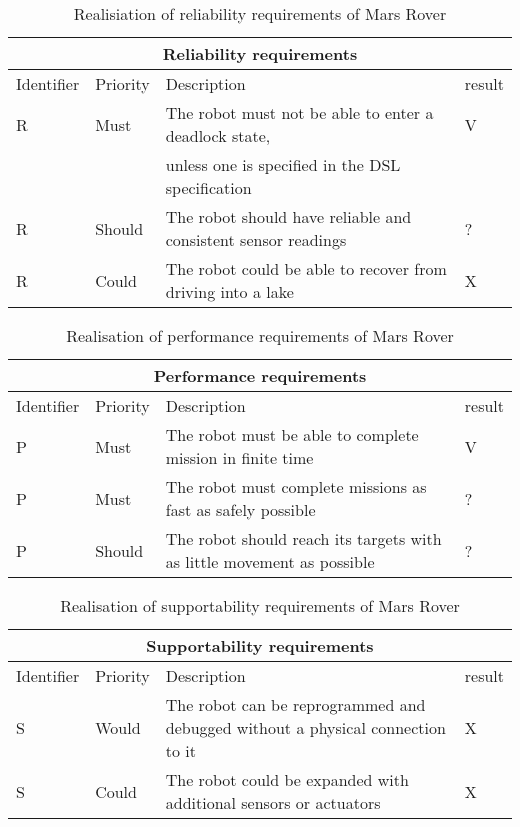 \setcounter{TCC}{1}
\begin{table}[H]
	\centering
	\begin{tabular}{|l|l|l|l|}
		\hline
		\multicolumn{4}{|c|}{Reliability requirements} \\  \hline
		\hline
		Identifier & Priority & Description & result \\  
		\hline
		\hline
		R\doTCC & Must & The robot must not be able to enter a deadlock state,
			& V\\  
				& 		& unless one is specified in the DSL specification 
			& \\  \hline
		R\doTCC & Should & The robot should have reliable and consistent 
			sensor readings & ?\\  \hline
		R\doTCC & Could & The robot could be able to recover from driving into
			a lake & X\\  
		\hline
	\end{tabular}
\caption{Realisiation of reliability requirements of Mars Rover}
\label{tbl:endReliabilityReq}
\end{table}

\setcounter{TCC}{1}
\begin{table}[H]
	\centering
	\begin{tabular}{|l|l|l|l|}
		\hline
		\multicolumn{4}{|c|}{Performance requirements} \\  \hline
		\hline
		Identifier & Priority & Description & result \\  
		\hline
		\hline
		P\doTCC & Must & The robot must be able to complete mission in finite 
			time & V \\  \hline
		P\doTCC & Must & The robot must complete missions as fast as safely 
			possible & ? \\   \hline
		P\doTCC & Should & The robot should reach its targets with as little 
			movement as possible & ? \\  
		\hline
	\end{tabular}
\caption{Realisation of performance requirements of Mars Rover}
\label{tbl:endPerformanceReq}
\end{table}

\setcounter{TCC}{1}
\begin{table}[H]
	\centering
	\begin{tabular}{|l|l|l|l|}
		\hline
		\multicolumn{4}{|c|}{Supportability requirements} \\  \hline
		\hline
		Identifier & Priority & Description & result\\  
		\hline
		\hline
		S\doTCC & Would & The robot can be reprogrammed and debugged without
			a physical connection to it & X\\  \hline
		S\doTCC & Could & The robot could be expanded with additional sensors
			or actuators & X\\  
		\hline
	\end{tabular}
\caption{Realisation of supportability requirements of Mars Rover}
\label{tbl:endSupportabilityReq}
\end{table}